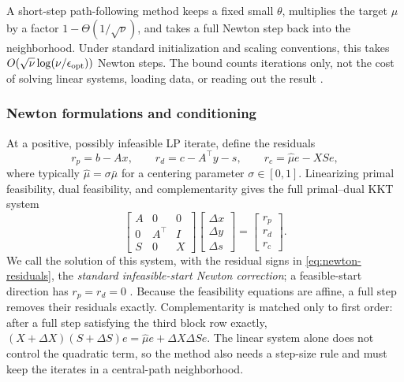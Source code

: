 A short-step path-following method keeps a fixed small $\theta$, multiplies the
target $\mu$ by a factor $1-\Theta(1/\sqrt\nu)$, and takes a full Newton step
back into the neighborhood.  Under standard initialization and scaling
conventions, this takes $O(\sqrt\nu\log(\nu/\epsilon_{\rm opt}))$ Newton
steps.  The bound counts iterations only, not the cost of solving linear
systems, loading data, or reading out the result
\cite{nesterov1994-interior-point-polynomial-algorithms-convex,wright1997-primal-dual-interior-point-methods}.

\subsubsection{Newton formulations and conditioning}
\label{sec:newton-formulations}

At a positive, possibly infeasible LP iterate, define the residuals
\begin{equation}
 r_p=b-Ax,\qquad r_d=c-A^\top y-s,\qquad
 r_c=\widehat\mu e-XSe,
 \label{eq:newton-residuals}
\end{equation}
where typically $\widehat\mu=\sigma\bar\mu$ for a centering parameter
$\sigma\in[0,1]$.  Linearizing primal feasibility, dual feasibility, and
complementarity gives the full primal--dual KKT system
\begin{equation}
 \begin{bmatrix}
  A&0&0\\
  0&A^\top&I\\
  S&0&X
 \end{bmatrix}
 \begin{bmatrix}\Delta x\\\Delta y\\\Delta s\end{bmatrix}
 =
 \begin{bmatrix}r_p\\r_d\\r_c\end{bmatrix}.
 \label{eq:full-kkt}
\end{equation}
We call the solution of this system, with the residual signs in
\eqref{eq:newton-residuals}, the \emph{standard infeasible-start Newton
correction}; a feasible-start direction has $r_p=r_d=0$
\cite{wright1997-primal-dual-interior-point-methods}.  Because the
feasibility equations are affine, a full step removes their residuals exactly.
Complementarity is matched only to first order: after a full step satisfying
the third block row exactly,
$(X+\Delta X)(S+\Delta S)e=\widehat\mu e+\Delta X\Delta S e$.
The linear system alone does not control the quadratic term, so the method
also needs a step-size rule and must keep the iterates in a central-path
neighborhood.

